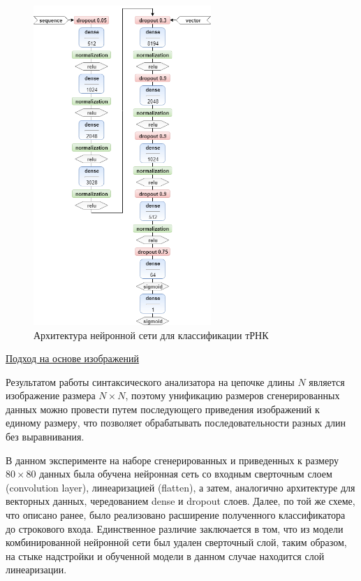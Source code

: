 \begin{figure} [!ht]
\begin{center}
\centering
\includegraphics[width=0.6\textwidth]{Lunina/pics/nn.png}
\caption{Архитектура нейронной сети для классификации тРНК}
\label{nn1}
\end{center}
\end{figure}

\underline{Подход на основе изображений}

Результатом работы синтаксического анализатора на цепочке длины $N$ является изображение размера $N\times N$, поэтому унификацию размеров сгенерированных данных можно провести путем последующего приведения изображений к единому размеру, что позволяет обрабатывать последовательности разных длин без выравнивания.

В данном эксперименте на наборе сгенерированных и приведенных к размеру $80\times80$ данных была обучена нейронная сеть со входным сверточным слоем (convolution layer), линеаризацией (flatten), а затем, аналогично архитектуре для векторных данных, чередованием dense и dropout слоев. Далее, по той же схеме, что описано ранее, было реализовано расширение полученного классификатора до строкового входа. Единственное различие заключается в том, что из модели комбинированной нейронной сети был удален сверточный слой, таким образом, на стыке надстройки и обученной модели в данном случае находится слой линеаризации.

